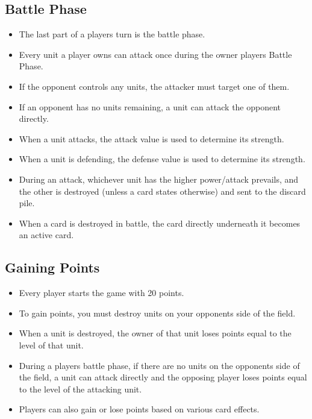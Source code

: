 \subsection{Battle Phase}
\begin{itemize}
    \item The last part of a players turn is the battle phase.
    \item Every unit a player owns can attack once during the owner players Battle Phase.
    \item If the opponent controls any units, the attacker must target one of them.
    \item If an opponent has no units remaining, a unit can attack the opponent directly.
    \item When a unit attacks, the attack value is used to determine its strength.
    \item When a unit is defending, the defense value is used to determine its strength.
    \item During an attack, whichever unit has the higher power/attack prevails, and the other is destroyed (unless a card states otherwise) and sent to the discard pile.
    \item When a card is destroyed in battle, the card directly underneath it becomes an active card.
\end{itemize}








\subsection{Gaining Points}
\begin{itemize}
    \item Every player starts the game with 20 points.
    \item To gain points, you must destroy units on your opponents side of the field.
    \item When a unit is destroyed, the owner of that unit loses points equal to the level of that unit.
    \item During a players battle phase, if there are no units on the opponents side of the field, a unit can attack directly and the opposing player loses points equal to the level of the attacking unit.
    \item Players can also gain or lose points based on various card effects.
\end{itemize}








